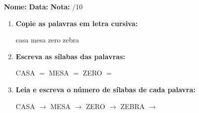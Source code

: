 \begin{exercicio}



\noindent\textbf{Nome:} \underline{\hspace{3.2cm}} \quad \textbf{Data:} \underline{\hspace{1.6cm}} \quad \textbf{Nota:} \underline{\hspace{0.9cm}}/10


\begin{enumerate}

  \item \textbf{Copie as palavras em letra cursiva:}
  \begin{center}
  casa \quad mesa \quad zero \quad zebra
  \end{center}
  \begin{center}
  \underline{\hspace{2.4cm}} \quad \underline{\hspace{2.4cm}} \quad \underline{\hspace{2.4cm}} \quad \underline{\hspace{2.4cm}}
  \end{center}

  \item \textbf{Escreva as sílabas das palavras:}
  \begin{center}
  CASA $=$ \underline{\hspace{1.5cm}} \underline{\hspace{1.5cm}} \quad MESA $=$ \underline{\hspace{1.5cm}} \underline{\hspace{1.5cm}} \quad ZERO $=$ \underline{\hspace{1.5cm}} \underline{\hspace{1.5cm}}
  \end{center}

  \item \textbf{Leia e escreva o número de sílabas de cada palavra:}
  \begin{center}
  CASA $\rightarrow$ \underline{\hspace{0.9cm}} \quad MESA $\rightarrow$ \underline{\hspace{0.9cm}} \quad ZERO $\rightarrow$ \underline{\hspace{0.9cm}} \quad ZEBRA $\rightarrow$ \underline{\hspace{0.9cm}}
  \end{center}


\end{enumerate}
\end{exercicio}
